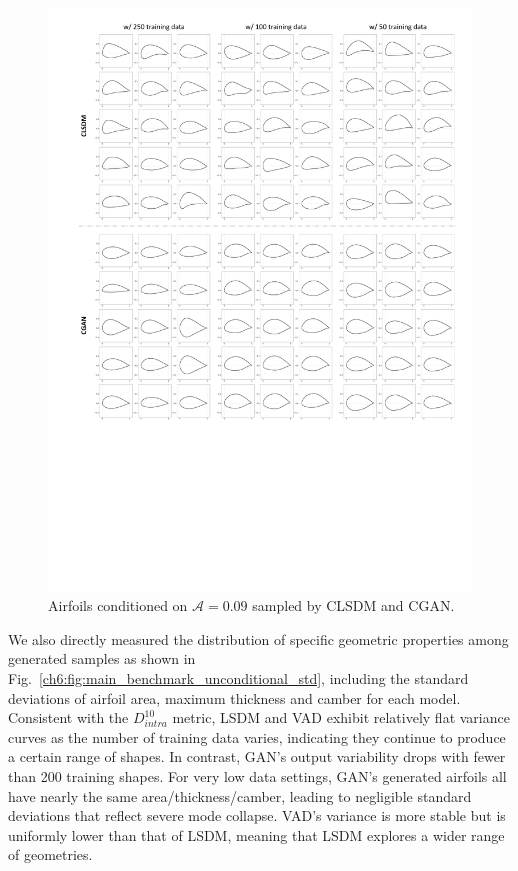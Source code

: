 \begin{figure}[!th]
    \begin{center}
        \includegraphics[width=1\linewidth]{chapter6/fig/fig_con_airfoils_updated.pdf}
    \end{center}
    \caption{
     \small Airfoils conditioned on $\mathcal{A}=0.09$ sampled by CLSDM and CGAN.
    }
    \label{ch6:fig:main_conditional_airfoils}
\end{figure}

We also directly measured the distribution of specific geometric properties among generated samples as shown in Fig.~\ref{ch6:fig:main_benchmark_unconditional_std}, including the standard deviations of airfoil area, maximum thickness and camber for each model. Consistent with the $D_{intra}^{10}$ metric, LSDM and VAD exhibit relatively flat variance curves as the number of training data varies, indicating they continue to produce a certain range of shapes. In contrast, GAN’s output variability drops with fewer than 200 training shapes. For very low data settings, GAN’s generated airfoils all have nearly the same area/thickness/camber, leading to negligible standard deviations that reflect severe mode collapse. VAD’s variance is more stable but is uniformly lower than that of LSDM, meaning that LSDM explores a wider range of geometries.

